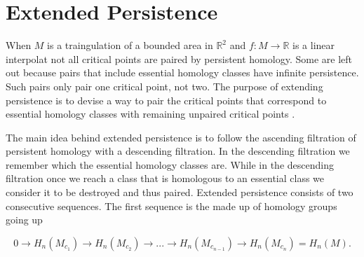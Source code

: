 \section{Extended Persistence}



%
%

%



When $M$ is a traingulation of a bounded area in $\mathbb{R}^2$ and $f: M \to \mathbb{R}$ is a linear interpolat not all critical points are paired by persistent homology. Some are left out because pairs that include essential homology classes have infinite persistence. Such pairs only pair one critical point, not two. The purpose of extending persistence is to devise a way to pair the critical points that correspond to essential homology classes with remaining unpaired critical points \cite{persistence-extended}.

The main idea behind extended persistence is to follow the ascending filtration of persistent homology with a descending filtration. In the descending filtration we remember which the essential homology classes are. While in the descending filtration once we reach a class that is homologous to an essential class we consider it to be destroyed and thus paired. Extended persistence consists of two consecutive sequences. The first sequence is the made up of homology groups going up

$$ 0 \rightarrow H_n(M_{c_1}) \rightarrow H_n(M_{c_2}) \rightarrow ... \rightarrow H_n(M_{c_{n-1}}) \rightarrow H_n(M_{c_n}) =  H_n(M) .$$

